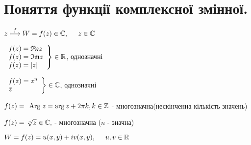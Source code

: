 \section{Поняття функції комплексної змінної.}
$z\overset{f}{\longmapsto}W=f(z)\in\mathbb{C},\hspace*{0.5cm} z\in\mathbb{C}$
\begin{example}
	$\left.\begin{array}{l}
		f(z)=\mathfrak{Re} z\\f(z)=\mathfrak{Im} z\\f(z)=|z|
	\end{array}\right\}\in\mathbb{R}$, однозначні
\end{example}
\begin{example}
	$\left.\begin{array}{l}
		f(z)=z^n\\\bar{z}
	\end{array}\right\}\in\mathbb{C}$, однозначні
\end{example}
\begin{example}
	$f(z)=\hspace*{0.15cm}\textrm{Arg}\hspace*{0.1cm} z=\arg z+2\pi k,k\in\mathbb{Z}$ - многозначна(нескінченна кількість значень)
\end{example}
\begin{example}
	$f(z)=\sqrt[n]{z}\in\mathbb{C},$ - многозначна ($n$ - значна)
\end{example}
$W=f(z)=u(x,y)+iv(x,y),\hspace*{0.5cm} u,v\in\mathbb{R}$

